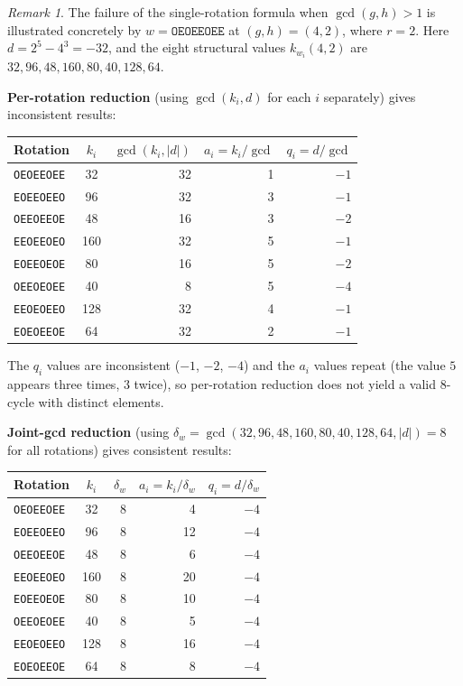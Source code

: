 \documentclass[12pt]{article}
\theoremstyle{definition}
\theoremstyle{remark}
\newtheorem{remark}[theorem]{Remark}
\newcommand{\kpoly}{k}
\begin{document}
\begin{remark}
The failure of the single-rotation formula when $\gcd(g,h) > 1$ is
illustrated concretely by $w = \texttt{OEOEEOEE}$ at $(g,h) = (4,2)$,
where $r = 2$.  Here $d = 2^5 - 4^3 = -32$, and the eight structural
values $\kpoly_{w_i}(4,2)$ are $32, 96, 48, 160, 80, 40, 128, 64$.

\smallskip
\noindent\textbf{Per-rotation reduction} (using $\gcd(k_i, d)$ for each $i$
separately) gives inconsistent results:

\begin{center}
\begin{tabular}{lcrrr}
\hline
Rotation & $k_i$ & $\gcd(k_i,|d|)$ & $a_i = k_i/\gcd$ & $q_i = d/\gcd$ \\
\hline
\texttt{OEOEEOEE} & 32 & 32 & 1 & $-1$ \\
\texttt{EOEEOEEO} & 96 & 32 & 3 & $-1$ \\
\texttt{OEEOEEOE} & 48 & 16 & 3 & $-2$ \\
\texttt{EEOEEOEO} & 160 & 32 & 5 & $-1$ \\
\texttt{EOEEOEOE} & 80 & 16 & 5 & $-2$ \\
\texttt{OEEOEOEE} & 40 &  8 & 5 & $-4$ \\
\texttt{EEOEOEEO} & 128 & 32 & 4 & $-1$ \\
\texttt{EOEOEEOE} & 64 & 32 & 2 & $-1$ \\
\hline
\end{tabular}
\end{center}

\noindent The $q_i$ values are inconsistent ($-1$, $-2$, $-4$) and the $a_i$
values repeat (the value $5$ appears three times, $3$ twice), so per-rotation
reduction does not yield a valid $8$-cycle with distinct elements.

\smallskip
\noindent\textbf{Joint-gcd reduction} (using $\delta_w = \gcd(32,96,48,160,80,40,128,64,|d|) = 8$
for all rotations) gives consistent results:

\begin{center}
\begin{tabular}{lcrrr}
\hline
Rotation & $k_i$ & $\delta_w$ & $a_i = k_i/\delta_w$ & $q_i = d/\delta_w$ \\
\hline
\texttt{OEOEEOEE} & 32 & 8 & 4 & $-4$ \\
\texttt{EOEEOEEO} & 96 & 8 & 12 & $-4$ \\
\texttt{OEEOEEOE} & 48 & 8 & 6 & $-4$ \\
\texttt{EEOEEOEO} & 160 & 8 & 20 & $-4$ \\
\texttt{EOEEOEOE} & 80 & 8 & 10 & $-4$ \\
\texttt{OEEOEOEE} & 40 & 8 & 5 & $-4$ \\
\texttt{EEOEOEEO} & 128 & 8 & 16 & $-4$ \\
\texttt{EOEOEEOE} & 64 & 8 & 8 & $-4$ \\
\hline
\end{tabular}
\end{center}


\end{remark}
\end{document}
